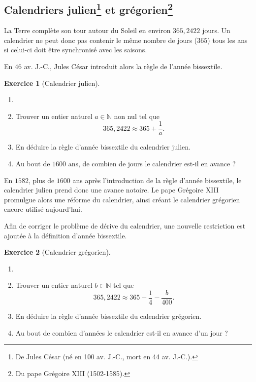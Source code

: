 \documentclass[a4paper, 14pt]{extarticle}
\theoremstyle{plain}
\theoremstyle{definition}
\newtheorem{ex}{Exercice}
\newcommand{\N}{\mathbb{N}}
\begin{document}
\pagestyle{fancy}
\fancyhead[R]{\today}



\subsection*{Calendriers julien\footnote{De Jules César (né en 100 av. J.-C., mort en 44 av. J.-C.).} et grégorien\footnote{Du pape Grégoire XIII (1502-1585).}}

La Terre complète son tour autour du Soleil en environ $365{,}2422$ jours. 
Un calendrier ne peut donc pas contenir le même nombre de jours ($365$) tous les ans si celui-ci doit être synchronisé avec les saisons.

En $46$ av. J.-C., Jules César introduit alors la règle de l'année bissextile.

\begin{ex}[Calendrier julien]
	\begin{enumerate}
		\item[]
		\item
		Trouver un entier naturel $a \in \N$ non nul tel que
			\[ 365{,}2422 \approx 365 + \dfrac1a.\]

		\item
		En déduire la règle d'année bissextile du calendrier julien.
		
		\item Au bout de $1600$ ans, de combien de jours le calendrier est-il en avance ?
	\end{enumerate}
\end{ex}

En $1582$, plus de $1600$ ans après l'introduction de la règle d'année bissextile, le calendrier julien prend donc une avance notoire.
Le pape Grégoire XIII promulgue alors une réforme du calendrier, ainsi créant le calendrier grégorien encore utilisé aujourd'hui.

Afin de corriger le problème de dérive du calendrier, une nouvelle restriction est ajoutée à la définition d'année bissextile.

\begin{ex}[Calendrier grégorien]
	\begin{enumerate}
		\item[]
		\item
		Trouver un entier naturel $b \in \N$ tel que
			\[ 365{,}2422 \approx 365 + \dfrac14 - \dfrac{b}{400}.\]

		\item  En déduire la règle d'année bissextile du calendrier grégorien.
		
		\item Au bout de combien d'années le calendrier est-il en avance d'un jour ?
	\end{enumerate}
\end{ex}
\end{document}
